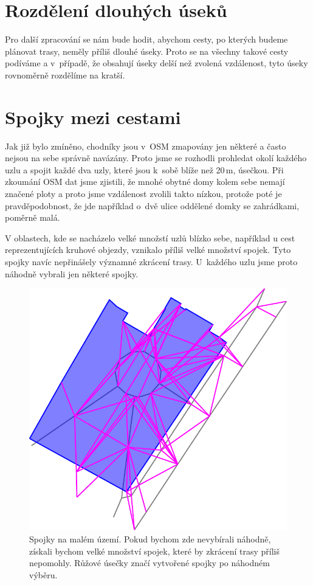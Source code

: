 \section{Rozdělení dlouhých úseků}
Pro další zpracování se nám bude hodit, abychom cesty, po kterých budeme
plánovat trasy, neměly příliš dlouhé úseky. Proto se na všechny takové cesty
podíváme a v~případě, že obsahují úseky delší než zvolená vzdálenost, tyto úseky
rovnoměrně rozdělíme na kratší. 

\section{Spojky mezi cestami}
Jak již bylo zmíněno, chodníky jsou v~OSM zmapovány jen některé a často nejsou
na sebe správně navázány. Proto jsme se rozhodli prohledat okolí každého uzlu a
spojit každé dva uzly, které jsou k~sobě blíže než 20\,m, úsečkou. Při zkoumání
OSM dat jsme zjistili, že mnohé obytné domy kolem sebe nemají značené ploty a
proto jsme vzdálenost zvolili takto nízkou, protože poté je pravděpodobnost, že
jde například o~dvě ulice oddělené domky se zahrádkami, poměrně malá.  

V oblastech, kde se nacházelo velké množstí uzlů blízko sebe, například u cest
reprezentujících kruhové objezdy, vznikalo příliš velké množství spojek. Tyto
spojky navíc nepřinášely významné zkrácení trasy. U~každého uzlu jsme proto
náhodně vybrali jen některé spojky.

\begin{figure}[h]
	\centering
	\includegraphics{../img/spojky.pdf}
	\caption{Spojky na malém území. Pokud bychom zde nevybírali náhodně, získali
	bychom velké množství spojek, které by zkrácení trasy příliš nepomohly.
	Růžové úsečky značí vytvořené spojky po náhodném výběru.}
	\label{fig:spojky}
\end{figure}


